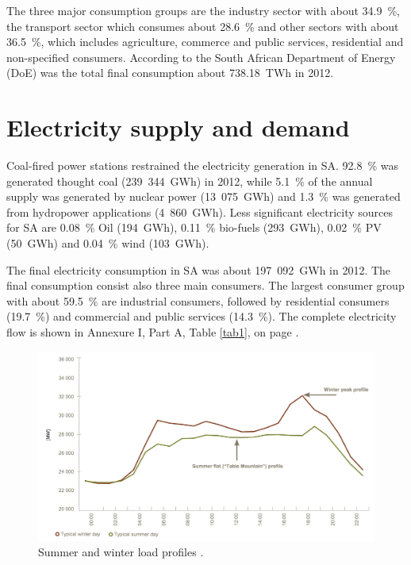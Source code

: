 The three major consumption groups are the industry sector with about 34.9~\%, the transport sector which consumes about 28.6~\% and other sectors with about 36.5~\%, which includes agriculture, commerce and public services, residential and non-specified consumers. According to the South African Department of Energy (DoE) was the total final consumption about 738.18~TWh in 2012. \cite{DepartmentofEnergy2012}
\pagebreak
\section{Electricity supply and demand}
Coal-fired power stations restrained the electricity generation in SA. 92.8~\% was generated thought coal (239~344~GWh) in 2012, while 5.1~\% of the annual supply was generated by nuclear power (13~075~GWh) and 1.3~\% was generated from hydropower applications (4~860~GWh). Less significant electricity sources for SA are 0.08~\% Oil (194~GWh), 0.11~\% bio-fuels (293~GWh), 0.02~\% PV (50~GWh) and 0.04~\% wind (103~GWh). \cite{Agency2015}



The final electricity consumption in SA was about 197~092~GWh in 2012. The final consumption consist also three main consumers. The largest consumer group with about 59.5~\% are industrial consumers, followed by residential consumers (19.7~\%) and commercial and public services (14.3~\%). The complete electricity flow is shown in Annexure I, Part A, Table \ref{tab1}, on page \pageref{tab1}. \cite{Agency2015}

\begin{figure}[!h] %
\centering
\includegraphics[width=0.9\linewidth]{FIG/SummerWinterDemand}
\caption[Summer and winter load profiles.]{Summer and winter load profiles \cite{Eskom2014}.}\label{DEMAND}
\end{figure}



